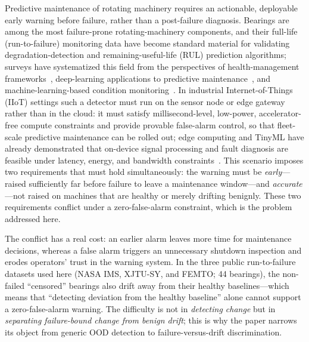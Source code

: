 \documentclass[journal]{IEEEtran}
\begin{document}
Predictive maintenance of rotating machinery requires an actionable, deployable early warning before failure, rather than a post-failure diagnosis. Bearings are among the most failure-prone rotating-machinery components, and their full-life (run-to-failure) monitoring data have become standard material for validating degradation-detection and remaining-useful-life (RUL) prediction algorithms; surveys have systematized this field from the perspectives of health-management frameworks~\cite{lei2018}, deep-learning applications to predictive maintenance~\cite{fink2020,hoang2019}, and machine-learning-based condition monitoring~\cite{surucu2023}. In industrial Internet-of-Things (IIoT) settings such a detector must run on the sensor node or edge gateway rather than in the cloud: it must satisfy millisecond-level, low-power, accelerator-free compute constraints and provide provable false-alarm control, so that fleet-scale predictive maintenance can be rolled out; edge computing and TinyML have already demonstrated that on-device signal processing and fault diagnosis are feasible under latency, energy, and bandwidth constraints~\cite{lu2023edge,abadade2023tinyml}. This scenario imposes two requirements that must hold simultaneously: the warning must be \emph{early}---raised sufficiently far before failure to leave a maintenance window---and \emph{accurate}---not raised on machines that are healthy or merely drifting benignly. These two requirements conflict under a zero-false-alarm constraint, which is the problem addressed here.

The conflict has a real cost: an earlier alarm leaves more time for maintenance decisions, whereas a false alarm triggers an unnecessary shutdown inspection and erodes operators' trust in the warning system. In the three public run-to-failure datasets used here (NASA IMS, XJTU-SY, and FEMTO; 44 bearings), the non-failed ``censored'' bearings also drift away from their healthy baselines---which means that ``detecting deviation from the healthy baseline'' alone cannot support a zero-false-alarm warning. The difficulty is not in \emph{detecting change} but in \emph{separating failure-bound change from benign drift}; this is why the paper narrows its object from generic OOD detection to failure-versus-drift discrimination.
\end{document}
